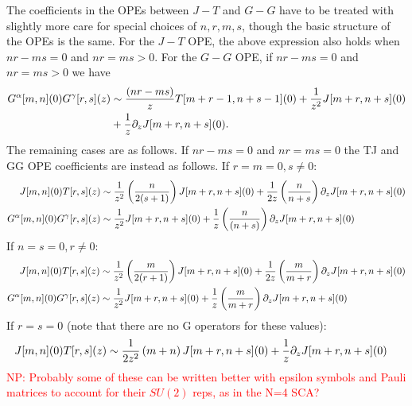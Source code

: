 \documentclass[../main.tex]{subfiles}
\begin{document}
The coefficients in the OPEs between $J-T$ and $G-G$ have to be treated with slightly more care for special choices of $n, r, m, s$, though the basic structure of the OPEs is the same.
For the $J-T$ OPE, the above expression also holds when $nr - ms = 0$ and $nr = m s >0$. 
For the $G-G$ OPE, if $n r - ms = 0$ and $nr = ms > 0$ we have
\begin{align}
G^{\alpha}[m, n](0)G^{\gamma}[r, s](z) &\sim {(nr-ms) \over z}T[m + r -1, n + s -1](0) + {1 \over z^2}J[m + r, n + s](0) \\ \nonumber
&+{1 \over z}\partial_z J[m + r, n+s](0).
\end{align}
The remaining cases are as follows. If $nr-ms = 0$ and $n r = ms = 0$ the TJ and GG OPE coefficients are instead as follows. \newline
If $r = m = 0, s \neq 0$:
\begin{align}
J[m, n](0)T[r, s](z) &\sim {1 \over z^2}\left({n \over 2(s + 1)}\right)J[m + r, n + s](0) +{1 \over 2 z}\left({n \over n + s} \right)\partial_z J[m + r, n + s](0) \\ \nonumber
G^{\alpha}[m, n](0)G^{\gamma}[r, s](z) &\sim {1 \over z^2}J[m + r, n + s](0) +{1 \over z}\left({n \over  (n + s)}\right)\partial_z J[m + r, n+s](0)
\end{align}
If $n = s = 0, r \neq 0$:
\begin{align}
J[m, n](0)T[r, s](z) &\sim {1 \over z^2}\left({m \over 2(r + 1)}\right)J[m + r, n + s](0) +{1 \over 2 z}\left({m \over m + r} \right)\partial_z J[m + r, n + s](0)\\
G^{\alpha}[m, n](0)G^{\gamma}[r, s](z) &\sim {1 \over z^2}J[m + r, n + s](0) +{1 \over z}\left({m \over m + r}\right)\partial_z J[m + r, n+s](0)
\end{align}
If $r = s= 0$ (note that there are no G operators for these values):
\begin{align}
J[m, n](0)T[r, s](z) &\sim {1 \over 2 z^2}\left(m + n\right)J[m + r, n + s](0) +{1 \over  z}\partial_z J[m + r, n + s](0)
\end{align}
\textcolor{red}{NP: Probably some of these can be written better with epsilon symbols and Pauli matrices to account for their $SU(2)$ reps, as in the N=4 SCA?}
\end{document}

